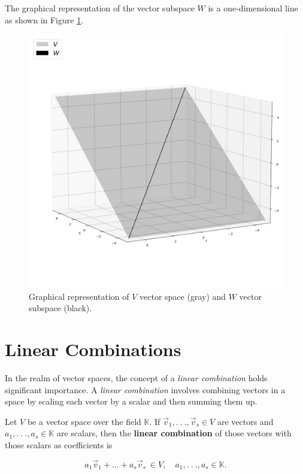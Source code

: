 The graphical representation of the vector subspace $W$ is a one-dimensional line as shown in Figure \ref{fig:vector-subspace-ex}.
\begin{figure}[h]
    \centering
    \includegraphics[scale=0.36]{Images/vector-subspace-ex.png}
    \caption{Graphical representation of $V$ vector space (gray) and $W$ vector subspace (black).}
    \label{fig:vector-subspace-ex}
\end{figure}
\newpage
\section{Linear Combinations}

In the realm of vector spaces, the concept of a \emph{linear combination} holds significant importance. A \emph{linear combination} involves combining vectors in a space by scaling each vector by a scalar and then summing them up. 

\begin{tcolorbox}[colback=def_color,colframe=gray] \begin{definition}
    Let $V$ be a vector space over the field $\mathbb K$. If $\vec{v}_1, . \ . \ ., \vec v_s \in V$ are vectors and $a_1, . \ . \ ., a_s \in \mathbb K$ are scalars, then the \textbf{linear combination} of those vectors with those scalars as coefficients is 

$$
a_1 \vec v_1 + \dots + a_s \vec v_s \ \in V, \quad a_1, . \ . \ ., a_s \in \mathbb K.
$$

\label{def:linear-combination}
\end{definition}
\end{tcolorbox}

